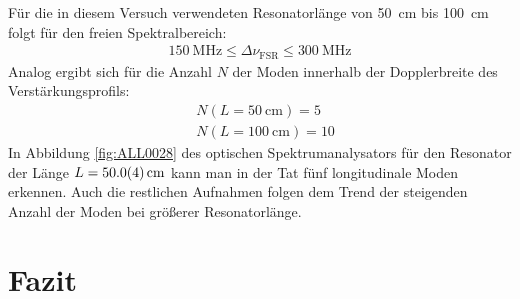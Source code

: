 \documentclass[11pt, a4paper]{article}
\numberwithin{equation}{section}
\begin{document}
Für die in diesem Versuch verwendeten Resonatorlänge von \SI{50}{\centi\metre} bis \SI{100}{\centi\metre} folgt für den freien Spektralbereich:
\begin{align}
\SI{150}{\mega\hertz} \le \Delta \nu_\mathrm{FSR} \le \SI{300}{\mega\hertz}
\end{align}
Analog ergibt sich für die Anzahl $N$ der Moden innerhalb der Dopplerbreite des Verstärkungsprofils:
\begin{align}
	&N(L = \SI{50}{\centi\metre}) = 5 \\
	&N(L = \SI{100}{\centi\metre}) = 10
\end{align}
In Abbildung \ref{fig:ALL0028} des optischen Spektrumanalysators für den Resonator der Länge $L = \SI{50 +- 0.4}{\centi\metre}$ kann man in der Tat fünf longitudinale Moden erkennen.
Auch die restlichen Aufnahmen folgen dem Trend der steigenden Anzahl der Moden bei größerer Resonatorlänge.



\section{Fazit}
\end{document}
